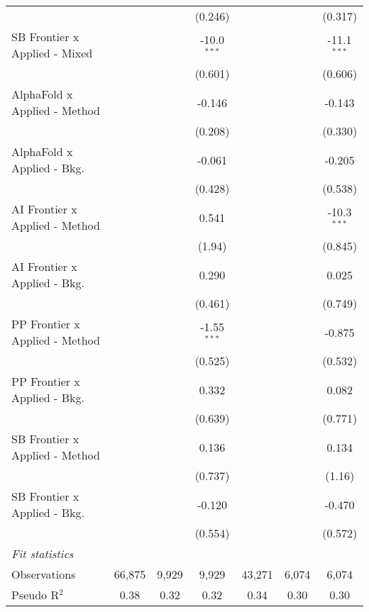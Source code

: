 \begin{tabular}{lcccccc}
                                  &         &         & (0.246)       &              &         & (0.317)\\   
   SB Frontier x Applied - Mixed  &         &         & -10.0$^{***}$ &              &         & -11.1$^{***}$\\   
                                  &         &         & (0.601)       &              &         & (0.606)\\   
   AlphaFold x Applied - Method   &         &         & -0.146        &              &         & -0.143\\   
                                  &         &         & (0.208)       &              &         & (0.330)\\   
   AlphaFold x Applied - Bkg.     &         &         & -0.061        &              &         & -0.205\\   
                                  &         &         & (0.428)       &              &         & (0.538)\\   
   AI Frontier x Applied - Method &         &         & 0.541         &              &         & -10.3$^{***}$\\   
                                  &         &         & (1.94)        &              &         & (0.845)\\   
   AI Frontier x Applied - Bkg.   &         &         & 0.290         &              &         & 0.025\\   
                                  &         &         & (0.461)       &              &         & (0.749)\\   
   PP Frontier x Applied - Method &         &         & -1.55$^{***}$ &              &         & -0.875\\   
                                  &         &         & (0.525)       &              &         & (0.532)\\   
   PP Frontier x Applied - Bkg.   &         &         & 0.332         &              &         & 0.082\\   
                                  &         &         & (0.639)       &              &         & (0.771)\\   
   SB Frontier x Applied - Method &         &         & 0.136         &              &         & 0.134\\   
                                  &         &         & (0.737)       &              &         & (1.16)\\   
   SB Frontier x Applied - Bkg.   &         &         & -0.120        &              &         & -0.470\\   
                                  &         &         & (0.554)       &              &         & (0.572)\\   
   \midrule
   \emph{Fit statistics}\\
   Observations                   & 66,875  & 9,929   & 9,929         & 43,271       & 6,074   & 6,074\\  
   Pseudo R$^2$                   & 0.38    & 0.32    & 0.32          & 0.34         & 0.30    & 0.30\\  
   

\end{tabular}
